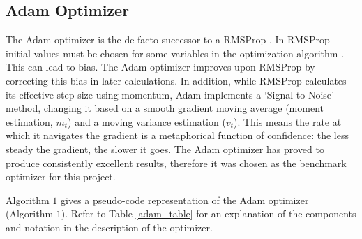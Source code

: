 \documentclass[titlepage,letterpaper]{article}
\begin{document}
\subsection{Adam Optimizer}
The Adam optimizer is the de facto successor to a RMSProp \cite{adam}. In RMSProp initial values must be chosen for some variables in the optimization algorithm \cite{adam}. This can lead to bias. The Adam optimizer improves upon RMSProp by correcting this bias in later calculations. In addition, while RMSProp calculates its effective step size using momentum, Adam implements a `Signal to Noise' method, changing it based on a smooth gradient moving average (moment estimation, $m_t$) and a moving variance estimation ($v_t$). This means the rate at which it navigates the gradient is a metaphorical function of confidence: the less steady the gradient, the slower it goes. The Adam optimizer has proved to produce consistently excellent results, therefore it was chosen as the benchmark optimizer for this project.

Algorithm $1$ gives a pseudo-code representation of the Adam optimizer (Algorithm $1$). Refer to Table \ref{adam_table} for an explanation of the components and notation in the description of the optimizer.
\end{document}
